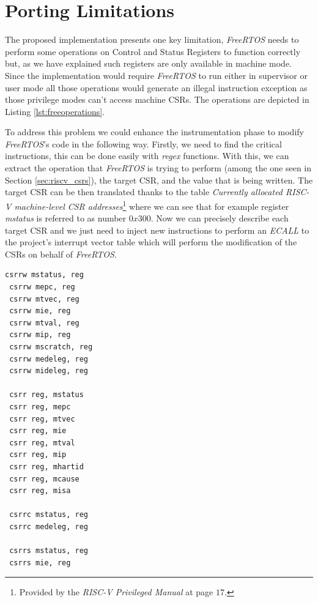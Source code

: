 \section{Porting Limitations}
\label{sec:rtos_limitations}

The proposed implementation presents one key limitation, \textit{FreeRTOS} needs
to perform some operations on Control and Status Registers to function correctly
but, as we have explained such registers are only available in machine mode.
Since the implementation would require \textit{FreeRTOS} to run either in supervisor
or user mode all those operations would generate an illegal instruction exception
as those privilege modes can't access machine CSRs. The operations are depicted
in Listing \ref{lst:freeoperations}.

To address this problem we could enhance the instrumentation phase to modify
\textit{FreeRTOS}'s code in the following way. Firstly, we need to find the critical
instructions, this can be done easily with \textit{regex} functions. With this, we
can extract the operation that \textit{FreeRTOS} is trying to perform (among the
one seen in Section \ref{sec:riscv_csrs}), the target CSR, and the value that is
being written. The target CSR can be then translated thanks to the table \textit{Currently
allocated RISC-V machine-level CSR addresses}\footnote{Provided by the \textit{RISC-V
Privileged Manual}\cite{riscv} at page $17$.} where we can see that for example register
\textit{mstatus} is referred to as number $0x300$. Now we can precisely describe
each target CSR and we just need to inject new instructions to perform an \textit{ECALL}
to the project's interrupt vector table which will perform the modification of
the CSRs on behalf of \textit{FreeRTOS}. \\
\begin{lstlisting}[style=Assembly, caption = \textit{FreeRTOS} operations on Control and Status Registers, label={lst:freeoperations}]
 csrrw mstatus, reg
 csrrw mepc, reg
 csrrw mtvec, reg
 csrrw mie, reg
 csrrw mtval, reg
 csrrw mip, reg
 csrrw mscratch, reg
 csrrw medeleg, reg
 csrrw mideleg, reg

 csrr reg, mstatus
 csrr reg, mepc
 csrr reg, mtvec
 csrr reg, mie
 csrr reg, mtval
 csrr reg, mip
 csrr reg, mhartid
 csrr reg, mcause
 csrr reg, misa

 csrrc mstatus, reg
 csrrc medeleg, reg

 csrrs mstatus, reg
 csrrs mie, reg
\end{lstlisting}

